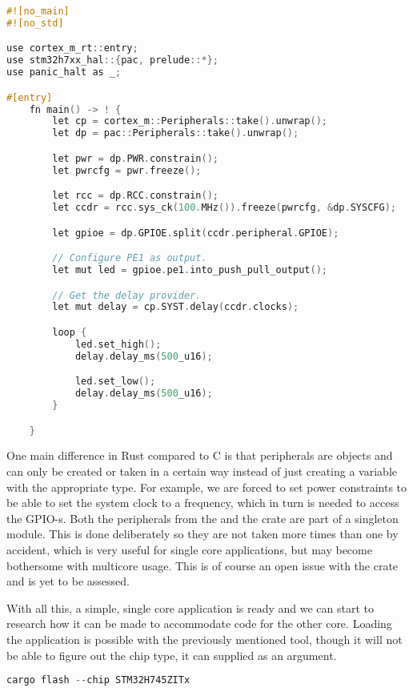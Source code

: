 \begin{lstlisting}[language=C,frame=single,float=!ht]
#![no_main]
#![no_std]

use cortex_m_rt::entry;
use stm32h7xx_hal::{pac, prelude::*};
use panic_halt as _;

#[entry]
    fn main() -> ! {
        let cp = cortex_m::Peripherals::take().unwrap();
        let dp = pac::Peripherals::take().unwrap();

        let pwr = dp.PWR.constrain();
        let pwrcfg = pwr.freeze();

        let rcc = dp.RCC.constrain();
        let ccdr = rcc.sys_ck(100.MHz()).freeze(pwrcfg, &dp.SYSCFG);

        let gpioe = dp.GPIOE.split(ccdr.peripheral.GPIOE);

        // Configure PE1 as output.
        let mut led = gpioe.pe1.into_push_pull_output();

        // Get the delay provider.
        let mut delay = cp.SYST.delay(ccdr.clocks);

        loop {
            led.set_high();
            delay.delay_ms(500_u16);

            led.set_low();
            delay.delay_ms(500_u16);
        }

    }
\end{lstlisting}

One main difference in Rust compared to C is that peripherals are objects and can only be created or taken in a certain way instead of just creating a variable with the appropriate type. For example, we are forced to set power constraints to be able to set the system clock to a frequency, which in turn is needed to access the GPIO-s. Both the peripherals from the  and the  crate are part of a singleton module. This is done deliberately so they are not taken more times than one by accident, which is very useful for single core applications, but may become bothersome with multicore usage. This is of course an open issue with the  crate and is yet to be assessed. \cite{MulticorePeripherals}

With all this, a simple, single core application is ready and we can start to research how it can be made to accommodate code for the other core. Loading the application is possible with the previously mentioned  tool, though it will not be able to figure out the chip type, it can supplied as an argument.

\begin{lstlisting}[language=C,frame=single,float=!ht]
    cargo flash --chip STM32H745ZITx
\end{lstlisting}


